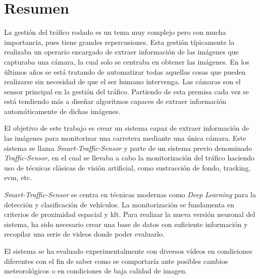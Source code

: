 \chapter*{Resumen}

La gestión del tráfico rodado es un tema muy complejo pero con mucha importancia, pues tiene grandes repercusiones. Esta gestión típicamente la realizaba un operario encargado de extraer información de las imágenes que capturaba una cámara, la cual solo se centraba en obtener las imágenes. En los últimos años se está tratando de automatizar todas aquellas cosas que pueden realizarse sin necesidad de que el ser humano intervenga. Las cámaras son el sensor principal en la gestión del tráfico. Partiendo de esta premisa cada  vez se está tendiendo más a diseñar algoritmos capaces de extraer información automáticamente de dichas imágenes.

El objetivo de este trabajo es crear un sistema capaz de extraer información de las imágenes para monitorizar una carretera mediante una única cámara. Este sistema se llama \textit{Smart-Traffic-Sensor} y parte de un sistema previo denominado \textit{Traffic-Sensor}, en el cual se llevaba a cabo la monitorización del tráfico haciendo uso de técnicas clásicas de visión artificial, como sustracción de fondo, tracking, \acrshort{svm}, etc.

\textit{Smart-Traffic-Sensor} se centra en técnicas modernas como \textit{Deep Learning} para la detección y clasificación de vehículos. La monitorización se fundamenta en criterios  de  proximidad  espacial  y \acrfull{klt}. Para realizar la nueva versión neuronal del sistema, ha sido necesario crear una base de datos con suficiente información y recopilar una serie de videos donde poder evaluarlo.

El sistema se ha evaluado experimentalmente con diversos vídeos en condiciones diferentes con el fin de saber como se comportaría ante posibles cambios meteorológicos o en condiciones de baja calidad de imagen.




